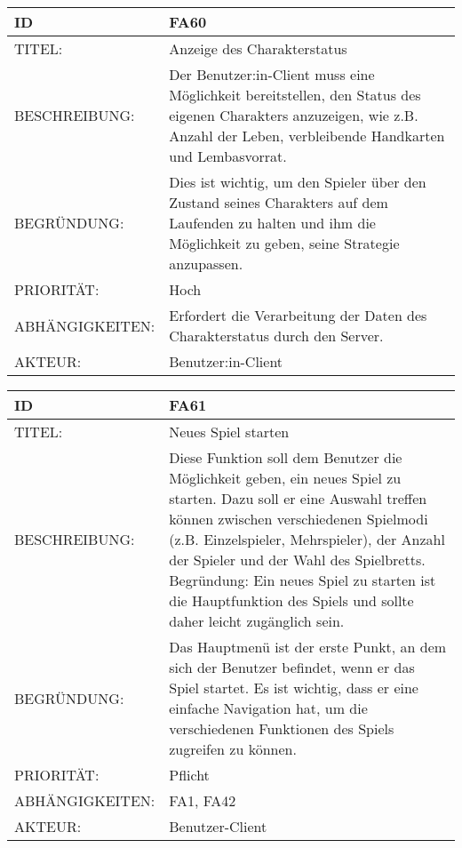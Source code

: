 \documentclass{uulm-assignment}
\begin{document}
     \begin{tabularx}{\textwidth}{|l|X |} \hline
        \textbf{ID} & \textbf{FA60} \\
        \hline
        TITEL: & Anzeige des Charakterstatus \\
        \hline
        BESCHREIBUNG: & Der Benutzer:in-Client muss eine Möglichkeit bereitstellen, den Status des eigenen Charakters anzuzeigen, wie z.B. Anzahl der Leben, verbleibende Handkarten und Lembasvorrat. 
        \\
        \hline
        BEGRÜNDUNG: &  Dies ist wichtig, um den Spieler über den Zustand seines Charakters auf dem Laufenden zu halten und ihm die Möglichkeit zu geben, seine Strategie anzupassen.\\
        \hline
        PRIORITÄT: & Hoch\\
        \hline
        ABHÄNGIGKEITEN: &  Erfordert die Verarbeitung der Daten des Charakterstatus durch den Server. \\
        \hline
        AKTEUR: & Benutzer:in-Client\\
        \hline
    \end{tabularx}
    
     \begin{tabularx}{\textwidth}{|l|X |} \hline
        \textbf{ID} & \textbf{FA61}\\
        \hline
        TITEL: & Neues Spiel starten\\
        \hline
        BESCHREIBUNG: & Diese Funktion soll dem Benutzer die Möglichkeit geben, ein neues Spiel zu starten. Dazu soll er eine Auswahl treffen können zwischen verschiedenen Spielmodi (z.B. Einzelspieler, Mehrspieler), der Anzahl der Spieler und der Wahl des Spielbretts.
Begründung: Ein neues Spiel zu starten ist die Hauptfunktion des Spiels und sollte daher leicht zugänglich sein.
        \\
        \hline
        BEGRÜNDUNG: & Das Hauptmenü ist der erste Punkt, an dem sich der Benutzer befindet, wenn er das Spiel startet. Es ist wichtig, dass er eine einfache Navigation hat, um die verschiedenen Funktionen des Spiels zugreifen zu können.
         \\
        \hline
        PRIORITÄT: & Pflicht \\
        \hline
        ABHÄNGIGKEITEN: & FA1, FA42 \\
        \hline
        AKTEUR: & Benutzer-Client \\
        \hline
    \end{tabularx}
    
\end{document}
